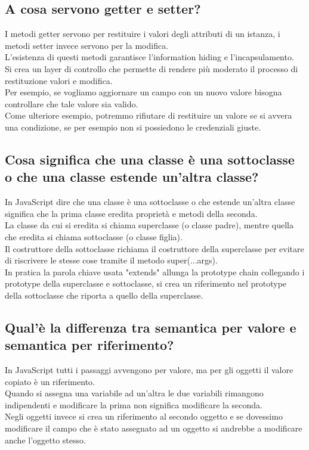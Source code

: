 \documentclass[12pt]{article}
\begin{document}
\subsection{A cosa servono getter e setter?}
I metodi getter servono per restituire i valori degli attributi di un istanza, i metodi setter invece servono per la modifica.\\
L'esistenza di questi metodi garantisce l'information hiding e l'incapsulamento.\\
Si crea un layer di controllo che permette di rendere più moderato il processo di restituzione valori e modifica.\\
Per esempio, se vogliamo aggiornare un campo con un nuovo valore bisogna controllare che tale valore sia valido.\\
Come ulteriore esempio, potremmo rifiutare di restituire un valore se si avvera una condizione, se per esempio non si possiedono le credenziali giuste.


\subsection{Cosa significa che una classe è una sottoclasse o che una classe estende un’altra classe?}
In JavaScript dire che una classe è una sottoclasse o che estende un'altra classe significa che la prima classe eredita proprietà e metodi della seconda.\\
La classe da cui si eredita si chiama superclasse (o classe padre), mentre quella che eredita si chiama sottoclasse (o classe figlia).\\
Il costruttore della sottoclasse richiama il costruttore della superclasse per evitare di riscrivere le stesse cose tramite il metodo super(...args).\\
In pratica la parola chiave usata "extends" allunga la prototype chain collegando i prototype della superclasse e sottoclasse, si crea un riferimento nel prototype della sottoclasse che riporta a quello della superclasse. 


\subsection{Qual'è la differenza tra semantica per valore e semantica per riferimento?}

In JavaScript tutti i passaggi avvengono per valore, ma per gli oggetti il valore copiato è un riferimento.\\
Quando si assegna una variabile ad un'altra le due variabili rimangono indipendenti e modificare la prima non significa modificare la seconda.\\
Negli oggetti invece si crea un riferimento al secondo oggetto e se dovessimo modificare il campo che è stato assegnato ad un oggetto si andrebbe a modificare anche l'oggetto stesso.
\end{document}
